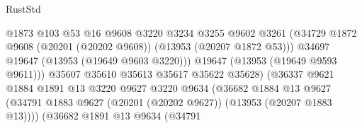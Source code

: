 \begin{lexlean}{RustStd}
\begin{coremodule}
                                              @1873
                                              @103
                                              @53
                                              @16
                                              @9608
                                              @3220
                                              @3234
                                              @3255
                                              @9602
                                              @3261
                                              (@34729
                                                @1872
                                                @9608
                                                (@20201 (@20202 @9608))
                                                (@13953 (@20207 @1872 @53)))
                                              @34697
                                              @19647
                                              (@13953 (@19649 @9603 @3220)))
                                            @19647
                                            (@13953 (@19649 @9593 @9611)))
                                          @35607
                                          @35610
                                          @35613
                                          @35617
                                          @35622
                                          @35628)
                                        (@36337
                                          @9621
                                          @1884
                                          @1891
                                          @13
                                          @3220
                                          @9627
                                          @3220
                                          @9634
                                          (@36682
                                            @1884
                                            @13
                                            @9627
                                            (@34791
                                              @1883
                                              @9627
                                              (@20201 (@20202 @9627))
                                              (@13953 (@20207 @1883 @13))))
                                          (@36682
                                            @1891
                                            @13
                                            @9634
                                            (@34791

\end{coremodule}
\end{lexlean}
